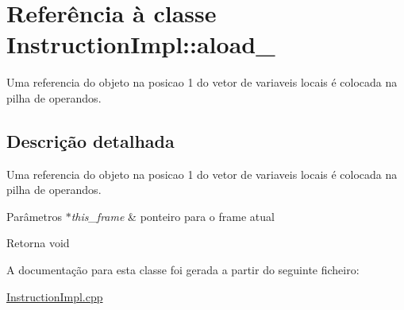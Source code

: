 \hypertarget{class_instruction_impl_1_1aload__1}{}\section{Referência à classe Instruction\+Impl\+:\+:aload\+\_}
\label{class_instruction_impl_1_1aload__1}


Uma referencia do objeto na posicao 1 do vetor de variaveis locais é colocada na pilha de operandos.  




\subsection{Descrição detalhada}
Uma referencia do objeto na posicao 1 do vetor de variaveis locais é colocada na pilha de operandos. 


\begin{DoxyParams}{Parâmetros}
{\em $\ast$this\+\_\+frame} & ponteiro para o frame atual \\
\hline
\end{DoxyParams}
\begin{DoxyReturn}{Retorna}
void 
\end{DoxyReturn}


A documentação para esta classe foi gerada a partir do seguinte ficheiro\+:\begin{DoxyCompactItemize}
\item 
\hyperlink{_instruction_impl_8cpp}{Instruction\+Impl.\+cpp}\end{DoxyCompactItemize}

